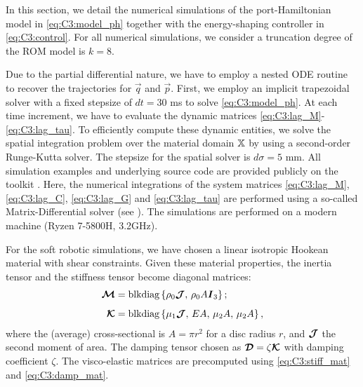 In this section, we detail the numerical simulations of the port-Hamiltonian model in \eqref{eq:C3:model_ph} together with the energy-shaping controller in \eqref{eq:C3:control}. For all numerical simulations, we consider a truncation degree of the ROM model is $k = 8$.

Due to the partial differential nature, we have to employ a nested ODE routine to recover the trajectories for $\vec{q}$ and $\vec{p}$. First, we employ an implicit trapezoidal solver with a fixed stepsize of $dt = 30 $ ms to solve \eqref{eq:C3:model_ph}. At each time increment, we have to evaluate the dynamic matrices \eqref{eq:C3:lag_M}-\eqref{eq:C3:lag_tau}. To efficiently compute these dynamic entities, we solve the spatial integration problem over the material domain $\mathbb{X}$ by using a second-order Runge-Kutta solver. The stepsize for the spatial solver is $d\sigma = 5$ mm. All simulation examples and underlying source code are provided publicly on the \sorotoki toolkit
\cite{Caasenbrood2020}. Here, the numerical integrations of the system matrices \eqref{eq:C3:lag_M}, \eqref{eq:C3:lag_C}, \eqref{eq:C3:lag_G} and \eqref{eq:C3:lag_tau} are performed using a so-called Matrix-Differential solver (see \cite{Caasenbrood2022}). The simulations are performed on a modern machine (Ryzen 7-5800H, 3.2GHz).

For the soft robotic simulations, we have chosen a linear isotropic Hookean material with shear constraints. %
Given these material properties, the inertia tensor and the stiffness tensor become diagonal matrices:
%
\begin{align*}
\boldsymbol{\mathcal{M}} & = \textnormal{blkdiag}\left\{ { \rho_0 \boldsymbol{\mathcal{J}},\, \rho_0 A \boldsymbol{I}_3} \right\}; \\[0.45em]
\boldsymbol{\mathcal{K}} & = \textnormal{blkdiag}\left\{ {\mu_1 \boldsymbol{\mathcal{J}},\, E A,\, \mu_2  A,\,\mu_2  A} \right\},
\end{align*}
%
where the (average) cross-sectional is $A = \pi r^2$ for a disc radius $r$, and $\boldsymbol{\mathcal{J}}$ the second moment of area. The damping tensor chosen as $\boldsymbol{\mathcal{D}} = \zeta \boldsymbol{\mathcal{K}}$ with damping coefficient $\zeta$. The visco-elastic matrices are precomputed using \eqref{eq:C3:stiff_mat} and \eqref{eq:C3:damp_mat}.

